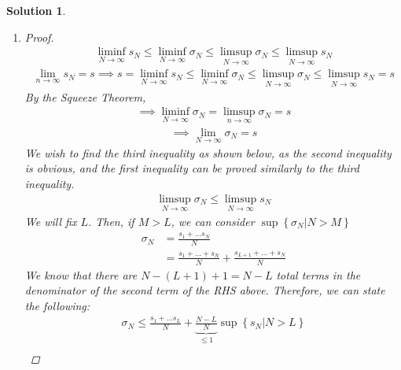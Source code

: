 \documentclass[12pt]{article}
\newtheorem{solution}{Solution}
\begin{document}
\begin{solution}
    \begin{enumerate}
        \item \begin{proof} 
            \begin{align}
                \liminf_{N \to \infty} s_{N} \leq \liminf_{N \to \infty} \sigma_{N} \leq \limsup_{N \to \infty} \sigma_{N} \leq \limsup_{N \to \infty} s_{N} 
            \end{align}
            \begin{align}
                \lim_{n \to \infty} s_{N} = s \implies s=\liminf_{N \to \infty} s_{N} \leq \liminf_{N \to \infty} \sigma_{N} \leq \limsup_{N \to \infty} \sigma_{N} \leq \limsup_{N \to \infty} s_{N} = s
            \end{align}
            By the Squeeze Theorem,
            \begin{align}
                \implies \liminf_{N \to \infty} \sigma_{N} =\limsup_{n \to \infty} \sigma_{N} =s 
            \end{align}
            \begin{align}
                \implies \lim_{N \to \infty} \sigma_{N} =s
            \end{align}
            We wish to find the third inequality as shown below, as the second inequality is obvious, and the first inequality can be proved similarly to the third inequality.
            \begin{align}
               \limsup_{N \to \infty} \sigma_{N} \leq \limsup_{N \to \infty} s_{N}  
            \end{align}
            We will fix $L$. Then, if $M>L$, we can consider $\sup \left\{ \sigma_{N} |N>M \right\} $ 
            \begin{align}
                \sigma_{N} &= \frac{s_{1}+\ldots s_{N}}{N}\\[10pt] 
                &= \frac{s_{1} +\ldots +s_{N}   }{N}+\frac{s_{L+1}+\ldots +s_{N}  }{N}
            \end{align}
            We know that there are $N-(L+1)+1=N-L$ total terms in the denominator of the second term of the RHS above. Therefore, we can state the following:
            \begin{align} 
                \sigma_{N} \leq \frac{s_{1}+\ldots s_{L}}{N} + \underbrace{\frac{N-L}{N}}_{\leq 1}\sup \left\{ s_{N} |N>L \right\} 
            \end{align}
            \begin{align}

\end{align}
\end{proof}
\end{enumerate}
\end{solution}
\end{document}
